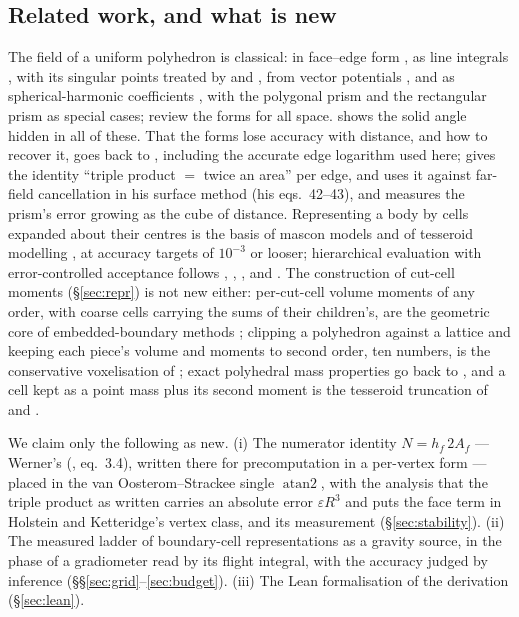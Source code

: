 \documentclass[10pt,a4paper]{article}
\newcommand{\cutcell}{cut-cell moments}
\begin{document}
\subsection{Related work, and what is new}\label{sec:related}

The field of a uniform polyhedron is classical: in face--edge form \citep{okabe1979,werner1994,werner1997},
as line integrals \citep{petrovic1996,tsoulis2012}, with its singular points treated by
\citet{tsoulis2001} and \citet{durso2013,durso2014}, from vector potentials \citep{conway2015}, and as
spherical-harmonic coefficients \citep{werner1997sh}, with the polygonal prism \citep{plouff1976} and
the rectangular prism \citep{nagy1966,banerjee1977,nagy2000,fukushima2020} as special cases; \citet{li1998}
review the forms for all space.
\citet{werner2017} shows the solid angle hidden in all of these. That the forms lose accuracy with
distance, and how to recover it, goes back to \citet{holstein1996}, including the accurate edge
logarithm used here; \citet[App.~B]{holstein2002} gives the identity ``triple product $=$ twice an
area'' per edge, and uses it against far-field cancellation in his surface method (his eqs.~42--43), and \citet{fukushima2020} measures the
prism's error growing as the cube of distance. Representing a body by cells expanded about their
centres is the basis of mascon models \citep{muller1968,werner1997,rathinam2019,wittick2019} and of
tesseroid modelling \citep{grombein2013,uieda2016,soler2019}, at accuracy targets of $10^{-3}$ or
looser; hierarchical evaluation with error-controlled acceptance follows \citet{barnes1986},
\citet{greengard1987}, \citet{salmon1994}, \citet{springel2005} and \citet{dehnen2014}.
The construction of \cutcell{} (\S\ref{sec:repr}) is not new either: per-cut-cell volume moments of any order, with coarse cells carrying the sums of
their children's, are the geometric core of embedded-boundary methods
\citep{johansen1998,schwartz2006,schwartz2015}; clipping a polyhedron against a lattice and keeping
each piece's volume and moments to second order, ten numbers, is the conservative voxelisation of
\citet{powell2015}; exact polyhedral mass properties go back to \citet{mirtich1996}, and a cell kept
as a point mass plus its second moment is the tesseroid truncation of \citet{grombein2013} and
\citet{heck2007}.

We claim only the following as new. (i) The numerator identity $N = h_f\,2A_f$ --- Werner's
(\citeyear{werner1994}, eq.~3.4), written there for precomputation in a per-vertex form --- placed in
the van Oosterom--Strackee single $\operatorname{atan2}$, with the analysis that the triple product as
written carries an absolute error $\varepsilon R^3$ and puts the face term in Holstein and
Ketteridge's vertex class, and its measurement (\S\ref{sec:stability}). (ii) The measured ladder of
boundary-cell representations as a gravity source, in the phase of a gradiometer read by its flight
integral, with the accuracy judged by inference (\S\S\ref{sec:grid}--\ref{sec:budget}). (iii) The
Lean formalisation of the derivation (\S\ref{sec:lean}).
\end{document}
